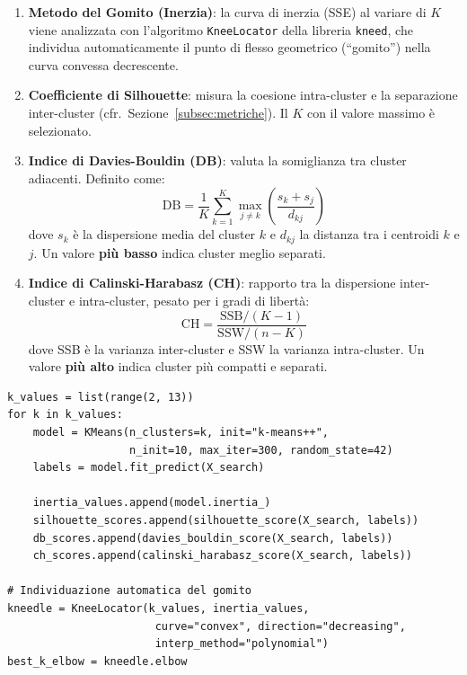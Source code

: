 \documentclass[a4paper,12pt]{article}
\begin{document}
\begin{enumerate}
    \item \textbf{Metodo del Gomito (Inerzia)}: la curva di inerzia
    (SSE) al variare di $K$ viene analizzata con l'algoritmo
    \texttt{KneeLocator} della libreria \texttt{kneed}, che individua
    automaticamente il punto di flesso geometrico (``gomito'') nella
    curva convessa decrescente.

    \item \textbf{Coefficiente di Silhouette}: misura la coesione
    intra-cluster e la separazione inter-cluster (cfr.\
    Sezione~\ref{subsec:metriche}). Il $K$ con il valore massimo è
    selezionato.

    \item \textbf{Indice di Davies-Bouldin (DB)}: valuta la somiglianza
    tra cluster adiacenti. Definito come:
    \begin{equation}
        \text{DB} = \frac{1}{K} \sum_{k=1}^{K} \max_{j \neq k}
        \left( \frac{s_k + s_j}{d_{kj}} \right)
    \end{equation}
    dove $s_k$ è la dispersione media del cluster $k$ e $d_{kj}$ la
    distanza tra i centroidi $k$ e $j$. Un valore \textbf{più basso}
    indica cluster meglio separati.

    \item \textbf{Indice di Calinski-Harabasz (CH)}: rapporto tra la
    dispersione inter-cluster e intra-cluster, pesato per i gradi di
    libertà:
    \begin{equation}
        \text{CH} = \frac{\text{SSB} / (K-1)}{\text{SSW} / (n-K)}
    \end{equation}
    dove SSB è la varianza inter-cluster e SSW la varianza intra-cluster.
    Un valore \textbf{più alto} indica cluster più compatti e separati.
\end{enumerate}

\begin{lstlisting}[caption={Calcolo delle quattro metriche per la ricerca del K ottimale.},label={lst:metriche_k}]
k_values = list(range(2, 13))
for k in k_values:
    model = KMeans(n_clusters=k, init="k-means++",
                   n_init=10, max_iter=300, random_state=42)
    labels = model.fit_predict(X_search)

    inertia_values.append(model.inertia_)
    silhouette_scores.append(silhouette_score(X_search, labels))
    db_scores.append(davies_bouldin_score(X_search, labels))
    ch_scores.append(calinski_harabasz_score(X_search, labels))

# Individuazione automatica del gomito
kneedle = KneeLocator(k_values, inertia_values,
                       curve="convex", direction="decreasing",
                       interp_method="polynomial")
best_k_elbow = kneedle.elbow
\end{lstlisting}
\end{document}
